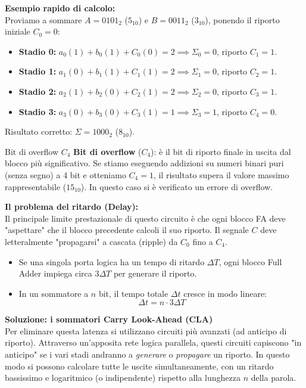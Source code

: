 \medskip
\textbf{Esempio rapido di calcolo:}\\
Proviamo a sommare $A = 0101_2$ ($5_{10}$) e $B = 0011_2$ ($3_{10}$), ponendo il riporto iniziale $C_0 = 0$:
\begin{itemize}
    \item \textbf{Stadio 0:} $a_0(1) + b_0(1) + C_0(0) = 2 \implies \Sigma_0 = 0$, riporto $C_1 = 1$.
    \item \textbf{Stadio 1:} $a_1(0) + b_1(1) + C_1(1) = 2 \implies \Sigma_1 = 0$, riporto $C_2 = 1$.
    \item \textbf{Stadio 2:} $a_2(1) + b_2(0) + C_2(1) = 2 \implies \Sigma_2 = 0$, riporto $C_3 = 1$.
    \item \textbf{Stadio 3:} $a_3(0) + b_3(0) + C_3(1) = 1 \implies \Sigma_3 = 1$, riporto $C_4 = 0$.
\end{itemize}
Risultato corretto: $\Sigma = 1000_2$ ($8_{10}$).

\begin{definizione}{Bit di overflow $C_4$}
\textbf{Bit di overflow} ($C_4$): è il bit di riporto finale in uscita dal blocco più significativo. Se stiamo eseguendo addizioni su numeri binari puri (senza segno) a 4 bit e otteniamo $C_4 = 1$, il risultato supera il valore massimo rappresentabile ($15_{10}$). In questo caso si è verificato un errore di overflow.
\end{definizione}

\textbf{Il problema del ritardo (Delay):}\\
Il principale limite prestazionale di questo circuito è che ogni blocco FA deve "aspettare" che il blocco precedente calcoli il suo riporto. Il segnale $C$ deve letteralmente "propagarsi" a cascata (ripple) da $C_0$ fino a $C_4$. 
\begin{itemize}
    \item Se una singola porta logica ha un tempo di ritardo $\Delta T$, ogni blocco Full Adder impiega circa $3\Delta T$ per generare il riporto.
    \item In un sommatore a $n$ bit, il tempo totale $\Delta t$ cresce in modo lineare:
    \[ \Delta t = n \cdot 3\Delta T \]
\end{itemize}

\textbf{Soluzione: i sommatori Carry Look-Ahead (CLA)}\\
Per eliminare questa latenza si utilizzano circuiti più avanzati (ad anticipo di riporto). Attraverso un'apposita rete logica parallela, questi circuiti capiscono "in anticipo" se i vari stadi andranno a \emph{generare} o \emph{propagare} un riporto. In questo modo si possono calcolare tutte le uscite simultaneamente, con un ritardo bassissimo e logaritmico (o indipendente) rispetto alla lunghezza $n$ della parola.

